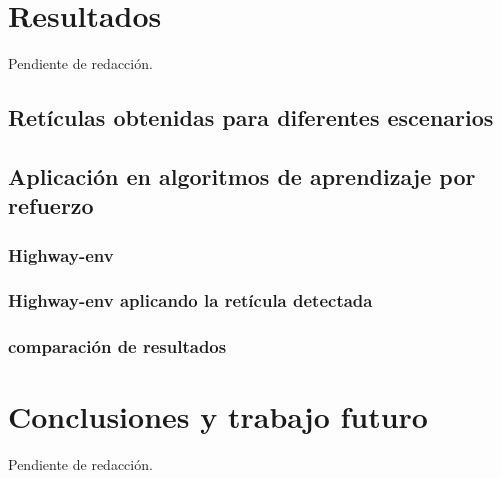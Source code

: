 \documentclass[10pt,letterpaper,final]{article}
\begin{document}
%

\clearpage
\section{Resultados}
Pendiente de redacción.
\subsection{Retículas obtenidas para diferentes escenarios}
\subsection{Aplicación en algoritmos de aprendizaje por refuerzo}
\subsubsection{Highway-env}
\subsubsection{Highway-env aplicando la retícula detectada}
\subsubsection{comparación de resultados}

\clearpage
\section{Conclusiones y trabajo futuro}
Pendiente de redacción.

\clearpage


\end{document}
